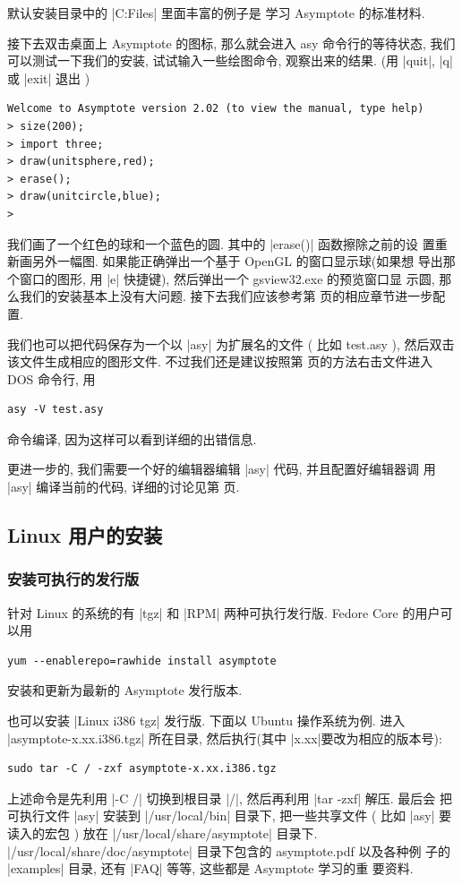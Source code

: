 \documentclass[nofonts,CJKnormalspaces]{ctexbook}[2009/05/20]
\begin{document}
默认安装目录中的 |C:\Program Files\Asymptote\examples| 里面丰富的例子是
学习 Asymptote 的标准材料.

接下去双击桌面上 Asymptote 的图标, 那么就会进入 asy 命令行的等待状态,
我们可以测试一下我们的安装, 试试输入一些绘图命令, 观察出来的结果. (用
|quit|, |q| 或 |exit| 退出 )
\begin{verbatim}
Welcome to Asymptote version 2.02 (to view the manual, type help)
> size(200);
> import three;
> draw(unitsphere,red);
> erase();
> draw(unitcircle,blue);
>
\end{verbatim}
我们画了一个红色的球和一个蓝色的圆. 其中的 |erase()| 函数擦除之前的设
置重新画另外一幅图. 如果能正确弹出一个基于 OpenGL 的窗口显示球(如果想
导出那个窗口的图形, 用 |e| 快捷键), 然后弹出一个 gsview32.exe 的预览窗口显
示圆, 那么我们的安装基本上没有大问题. 接下去我们应该参考第
\pageref{asy:Settings} 页的相应章节进一步配置.

我们也可以把代码保存为一个以 |asy| 为扩展名的文件 ( 比如 test.asy ),
然后双击该文件生成相应的图形文件. 不过我们还是建议按照第
\pageref{Windows:DOS} 页的方法右击文件进入 DOS 命令行, 用
\begin{verbatim}
asy -V test.asy
\end{verbatim}
命令编译, 因为这样可以看到详细的出错信息.

更进一步的, 我们需要一个好的编辑器编辑 |asy| 代码, 并且配置好编辑器调
用 |asy| 编译当前的代码, 详细的讨论见第 \pageref{asy:Editors} 页.

\subsection{Linux 用户的安装}
\subsubsection{安装可执行的发行版}
针对 Linux 的系统的有 |tgz| 和 |RPM| 两种可执行发行版.
Fedore Core 的用户可以用
\begin{verbatim}
yum --enablerepo=rawhide install asymptote
\end{verbatim}
安装和更新为最新的 Asymptote 发行版本.

也可以安装 |Linux i386 tgz| 发行版. 下面以
Ubuntu 操作系统为例. 进入 |asymptote-x.xx.i386.tgz| 所在目录,
然后执行(其中 |x.xx|要改为相应的版本号):

\begin{verbatim}
sudo tar -C / -zxf asymptote-x.xx.i386.tgz
\end{verbatim}
上述命令是先利用 |-C /| 切换到根目录 |/|, 然后再利用 |tar -zxf| 解压. 最后会
把可执行文件 |asy| 安装到 |/usr/local/bin| 目录下, 把一些共享文件
( 比如 |asy| 要读入的宏包 ) 放在 |/usr/local/share/asymptote| 目录下.
|/usr/local/share/doc/asymptote| 目录下包含的 asymptote.pdf 以及各种例
子的 |examples| 目录, 还有 |FAQ| 等等, 这些都是 Asymptote 学习的重
要资料.
\end{document}
